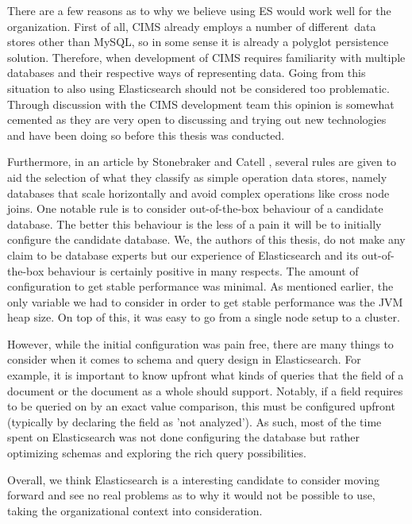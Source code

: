 There are a few reasons as to why we believe using ES would work well for the organization. First of all, CIMS already employs a number of different\footnotemark\ data stores other than MySQL, so in some sense it is already a polyglot persistence solution. Therefore, when development of CIMS requires familiarity with multiple databases and their respective ways of representing data. Going from this situation to also using Elasticsearch should not be considered too problematic. Through discussion with the CIMS development team this opinion is somewhat cemented as they are very open to discussing and trying out new technologies and have been doing so before this thesis was conducted. 


Furthermore, in an article by Stonebraker and Catell \cite{10rules}, several rules are given to aid the selection of what they classify as simple operation data stores, namely databases that scale horizontally and avoid complex operations like cross node joins. One notable rule is to consider out-of-the-box behaviour of a candidate database. The better this behaviour is the less of a pain it will be to initially configure the candidate database. We, the authors of this thesis, do not make any claim to be database experts but our experience of Elasticsearch and its out-of-the-box behaviour is certainly positive in many respects. The amount of configuration to get stable performance was minimal. As mentioned earlier, the only variable we had to consider in order to get stable performance was the JVM heap size. On top of this, it was easy to go from a single node setup to a cluster. 

However, while the initial configuration was pain free, there are many things to consider when it comes to schema and query design in Elasticsearch. For example, it is important to know upfront what kinds of queries that the field of a document or the document as a whole should support. Notably, if a field requires to be queried on by an exact value comparison, this must be configured upfront (typically by declaring the field as 'not analyzed'). As such, most of the time spent on Elasticsearch was not done configuring the database but rather optimizing schemas and exploring the rich query possibilities.

Overall, we think Elasticsearch is a interesting candidate to consider moving forward and see no real problems as to why it would not be possible to use, taking the organizational context into consideration.

